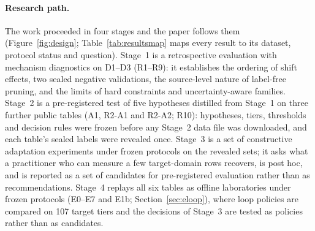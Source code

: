 \documentclass[11pt,a4paper]{article}
\begin{document}
\paragraph{Research path.} The work proceeded in four stages and the paper
follows them (Figure~\ref{fig:design}; Table~\ref{tab:resultsmap} maps every
result to its dataset, protocol status and question). Stage~1 is a
retrospective evaluation with mechanism diagnostics on D1--D3 (R1--R9): it
establishes the ordering of shift effects, two sealed negative validations,
the source-level nature of label-free pruning, and the limits of hard
constraints and uncertainty-aware families. Stage~2 is a pre-registered test
of five hypotheses distilled from Stage~1 on three further public tables
(A1, R2-A1 and R2-A2; R10): hypotheses, tiers, thresholds and decision rules
were frozen before any Stage~2 data file was downloaded, and each table's
sealed labels were revealed once. Stage~3 is a set of constructive adaptation
experiments under frozen protocols on the revealed sets; it asks what a
practitioner who can measure a few target-domain rows recovers, is post hoc,
and is reported as a set of candidates for pre-registered evaluation rather
than as recommendations. Stage~4 replays all six tables as offline
laboratories under frozen protocols (E0--E7 and E1b; Section~\ref{sec:eloop}),
where loop policies are compared on 107 target tiers and the decisions of
Stage~3 are tested as policies rather than as candidates.
\end{document}
